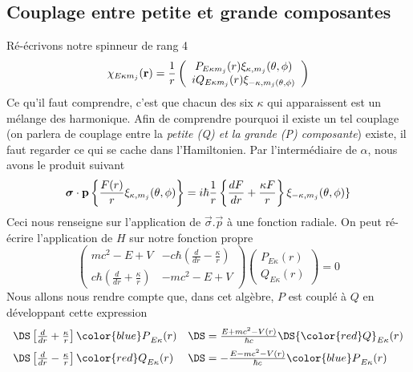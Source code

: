 \subsection{Couplage entre petite et grande composantes}
Ré-écrivons notre spinneur de rang 4
\begin{equation}
\chi_{E \kappa m_j} ({\bf r}) =\frac{1}{r} \left( \begin{array}{c}
 P_{E \kappa m_j}(r) \xi_{\kappa,m_j}(\theta, \phi) \\ 
 iQ_{E \kappa m_j} (r)  \xi_{- \kappa, m_j (\theta, \phi)} 
\end{array} \right)
\end{equation}
Ce qu'il faut comprendre, c'est que chacun des six $\kappa$ qui apparaissent est un mélange des 
harmonique. Afin de comprendre pourquoi il existe un tel couplage (on parlera de couplage entre 
la \textit{petite (Q) et la grande (P) composante}) existe, il faut regarder ce qui se cache dans
l'Hamiltonien. Par l'intermédiaire de $\alpha$, nous avons le produit suivant
\begin{equation}
\mbox{\boldmath $ \sigma $} \cdot {\bf p}
\left\{ \frac{F(r)}{r} \xi_{\kappa, m_j} (\theta, \phi) \right\}
= i \hbar \frac{1}{r} \left\{ \frac{dF}{dr} + \frac{\kappa F}{r} \right\}  \xi_{-\kappa, m_j} (\theta, \phi)\}
\end{equation}
Ceci nous renseigne sur l'application de $\vec{\sigma}.\vec{p}$ à une fonction radiale. On peut 
ré-écrire l'application de $H$ sur notre fonction propre
\begin{equation}
\left(
\begin{array}{cc}
mc^2 -E + V  &  -c \hbar \left( \frac{d}{dr} - \frac{\kappa}{r} \right) \\
 c \hbar \left( \frac{d}{dr} + \frac{\kappa}{r} \right) & -mc^2 -E + V 
\end{array} 
\right)
\left(
\begin{array}{c}
P_{E \kappa} (r) \\ Q_{E \kappa} (r) \end{array}
 \right) = 0
\end{equation}
Nous allons nous rendre compte que, dans cet algèbre, $P$ est couplé à $Q$ en développant cette
expression
\begin{equation}
\begin{array}{ll}
\DS\left[  \frac{d}{dr} + \frac{\kappa}{r}   \right] 
{\color{blue} P}_{E \kappa} (r)
&\DS= \frac{E + mc^2 - V(r)}{\hbar c} 
\DS{\color{red} Q}_{E \kappa} (r)\vspace{2mm}\\
\DS\left[  \frac{d}{dr} - \frac{\kappa}{r}   \right] 
{\color{red} Q}_{E \kappa} (r)
&\DS= - \frac{E - mc^2 - V(r)}{\hbar c} 
{\color{blue} P}_{E \kappa} (r)
\end{array}
\end{equation}
